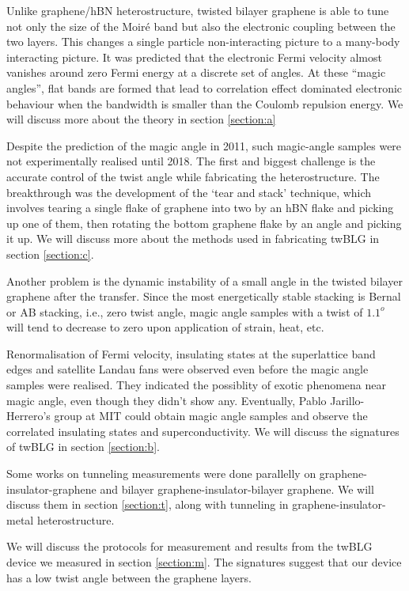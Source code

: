 Unlike graphene/hBN heterostructure, twisted bilayer graphene is able to tune not only the size of the Moiré band but also the electronic coupling between the two layers. This changes a single particle non-interacting picture to a many-body interacting picture. It was predicted that the electronic Fermi velocity almost vanishes around zero Fermi energy at a discrete set of angles. \cite{Bistritzer12233} At these “magic angles”, flat bands are formed that lead to correlation effect dominated electronic behaviour when the bandwidth is smaller than the Coulomb repulsion energy. We will discuss more about the theory in section \ref{section:a}

Despite the prediction of the magic angle in 2011, such magic-angle samples were not experimentally realised until 2018. The first and biggest challenge is the accurate control of the twist angle while fabricating the heterostructure. The breakthrough was the development of the ‘tear and stack’ technique, \cite{Kim16} which involves tearing a single flake of graphene into two by an hBN flake and picking up one of them, then rotating the bottom graphene flake by an angle and picking it up. We will discuss more about the methods used in fabricating twBLG in section \ref{section:c}.

Another problem is the dynamic instability of a small angle in the twisted bilayer graphene after the transfer. Since the most energetically stable stacking is Bernal or AB stacking, i.e., zero twist angle, magic angle samples with a twist of $1.1^o$ \cite{Bistritzer12233} will tend to decrease to zero upon application of strain, heat, etc. \cite{WangThermal,Woods2016}

Renormalisation of Fermi velocity, \cite{Cao2016,Yin2015,Andrei2011} insulating states at the superlattice band edges \cite{Cao2016} and satellite Landau fans were observed \cite{Schmidt2014,Cao2016} even before the magic angle samples were realised. They indicated the possiblity of exotic phenomena near magic angle, even though they didn't show any. Eventually, Pablo Jarillo-Herrero's group at MIT could obtain magic angle samples and observe the correlated insulating states and superconductivity. \cite{Cao2018, Cao2018_2} We will discuss the signatures of twBLG in section \ref{section:b}.

Some works on tunneling measurements were done parallelly on graphene-insulator-graphene and bilayer graphene-insulator-bilayer graphene. \cite{Mishchenko2014, Tutuc, Tutuc17, Tutuc18} We will discuss them in section \ref{section:t}, along with tunneling in graphene-insulator-metal heterostructure. \cite{chaves2013model}

We will discuss the protocols for measurement and results from the twBLG device we measured in section \ref{section:m}. The signatures suggest that our device has a low twist angle between the graphene layers.
